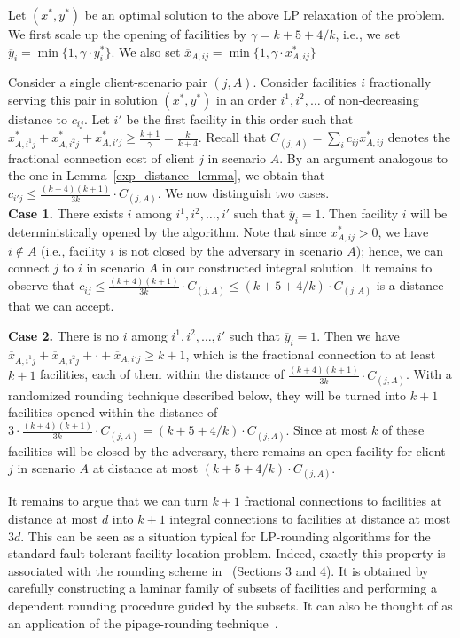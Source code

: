 \documentclass[11pt]{article}
\begin{document}
Let $(x^*,y^*)$ be an optimal solution to the above LP relaxation 
of the problem.
We first scale up the opening of facilities by $\gamma=k+5+4/k$,
i.e., we set $\overline{y}_i = \min\{1,\gamma \cdot y^*_i \}$.
We also set $\overline{x}_{A,ij} = \min\{1,\gamma \cdot x^*_{A,ij} \}$
 
Consider a single client-scenario pair $(j,A)$.
Consider facilities $i$ fractionally serving this pair in solution $(x^*,y^*)$
in an order $i^1, i^2, \ldots $ of non-decreasing distance to $c_{ij}$.
Let $i'$ be the first facility in this order such that 
$x^*_{A,i^1j} + x^*_{A,i^2j} + x^*_{A,i'j} \geq \frac{k+1}{\gamma} = \frac{k}{k+4}$.
Recall that $C_{(j,A)} = \sum_i c_{ij} x^*_{A,ij}$
denotes the fractional connection cost of client $j$ in scenario $A$.
By an argument analogous to the one in Lemma~\ref{exp_distance_lemma}, we obtain that 
$c_{i'j} \leq \frac{(k+4)(k+1)}{3k} \cdot C_{(j,A)}$.
We now distinguish two cases.\\
\textbf{Case 1.} There exists $i$ among $i^1, i^2, \ldots, i'$ such that $\overline{y}_i = 1$.
Then facility $i$ will be deterministically opened by the algorithm.
Note that since $x^*_{A,ij} >0$, we have $i \notin A$ (i.e., facility $i$ 
is not closed by the adversary
in scenario $A$); hence, we can connect $j$ to $i$ in scenario $A$ in our constructed integral solution. 
It remains to observe that $c_{ij} \leq \frac{(k+4)(k+1)}{3k} \cdot C_{(j,A)} \leq (k+5+4/k) \cdot C_{(j,A)}$ 
is a distance that we can accept.

\smallskip \noindent
\textbf{Case 2.} There is no $i$ among $i^1, i^2, \ldots, i'$ such that $\overline{y}_i = 1$.
Then we have $\overline{x}_{A,i^1j} + \overline{x}_{A,i^2j} + \cdot + \overline{x}_{A,i'j} \geq k+1$,
which is the fractional connection to at least $k+1$ facilities, each of them
within the distance of $\frac{(k+4)(k+1)}{3k} \cdot C_{(j,A)}$. 
With a randomized rounding technique described below, they will be turned into
$k+1$ facilities opened within the distance of $3 \cdot \frac{(k+4)(k+1)}{3k} \cdot C_{(j,A)} = 
(k+5+4/k) \cdot C_{(j,A)}$. Since at most $k$ of these facilities will be closed by the adversary,
there remains an open facility for client $j$ in scenario $A$ at distance at most $(k+5+4/k) \cdot C_{(j,A)}$.

It remains to argue that we can turn $k+1$ fractional connections to facilities at distance at most $d$
into $k+1$ integral connections to facilities at distance at most $3d$. This can be seen
as a situation typical for LP-rounding algorithms for the standard fault-tolerant facility location problem.
Indeed, exactly this property is associated with the rounding scheme in~\cite{ipco10} (Sections 3 and 4). 
It is obtained by carefully constructing
a laminar family of subsets of facilities and performing a dependent rounding procedure guided
by the subsets. It can also be thought of as an application of the pipage-rounding technique~\cite{AS}. 
\end{document}
